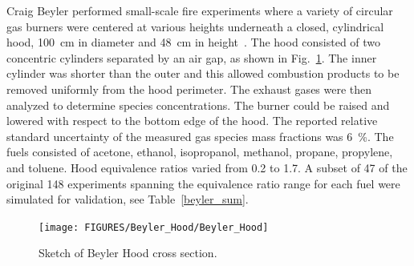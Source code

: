 Craig Beyler performed small-scale fire experiments where a variety of circular gas burners were centered at various heights underneath a closed, cylindrical hood, 100~cm in diameter and 48~cm in height~\cite{Beyler:Hood}.  The hood consisted of two concentric cylinders separated by an air gap, as shown in Fig.~\ref{Beyler_Hood_Sketch}.  The inner cylinder was shorter than the outer and this allowed combustion products to be removed uniformly from the hood perimeter.  The exhaust gases were then analyzed to determine species concentrations. The burner could be raised and lowered with respect to the bottom edge of the hood. The reported relative standard uncertainty of the measured gas species mass fractions was 6~\%. The fuels consisted of acetone, ethanol, isopropanol, methanol, propane, propylene, and toluene. Hood equivalence ratios varied from 0.2 to 1.7.  A subset of 47 of the original 148 experiments spanning the equivalence ratio range for each fuel were simulated for validation, see Table~\ref{beyler_sum}.

\begin{figure}[h]
\centering
\texttt{[image: FIGURES/Beyler\_Hood/Beyler\_Hood]}
\caption[Sketch of Beyler Hood cross section]{Sketch of Beyler Hood cross section.}
\label{Beyler_Hood_Sketch}
\end{figure}

